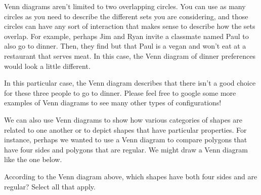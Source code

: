 \documentclass{ximera}
\begin{document}
Venn diagrams aren't limited to two overlapping circles. You can use as many circles as you need to describe the different sets you are considering, and those circles can have any sort of interaction that makes sense to describe how the sets overlap. For example, perhaps Jim and Ryan invite a classmate named Paul to also go to dinner. Then, they find but that Paul is a vegan and won't eat at a restaurant that serves meat. In this case, the Venn diagram of dinner preferences would look a little different.
\begin{image}
\end{image}
In this particular case, the Venn diagram describes that there isn't a good choice for these three people to go to dinner. Please feel free to google some more examples of Venn diagrams to see many other types of configurations!

We can also use Venn diagrams to show how various categories of shapes are related to one another or to depict shapes that have particular properties. For instance, perhaps we wanted to use a Venn diagram to compare polygons that have four sides and polygons that are regular. We might draw a Venn diagram like the one below.

\begin{image}
\end{image}

\begin{question}
According to the Venn diagram above, which shapes have both four sides and are regular? Select all that apply.
\begin{selectAll}
\end{selectAll}
\end{question}
\end{document}
